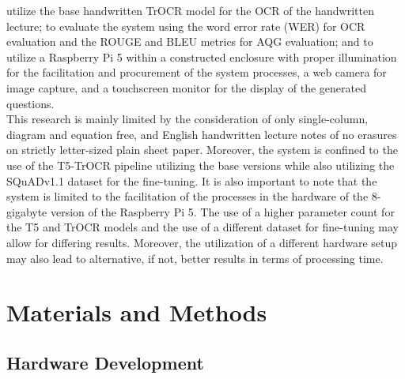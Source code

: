 \documentclass[conference]{IEEEtran}
\begin{document}
utilize the base handwritten TrOCR model for the OCR of the handwritten lecture;
to evaluate the system using the word error rate (WER) for OCR evaluation and
the ROUGE and BLEU metrics for AQG evaluation; and to utilize a Raspberry Pi 5
within a constructed enclosure with proper illumination for the 
facilitation and procurement of the system processes, a web camera for image
capture, and a touchscreen monitor for the display of the generated questions.
\\ 
\indent This research is mainly limited by the consideration of only 
single-column, diagram and equation free, and English handwritten lecture notes 
of no erasures on strictly letter-sized plain sheet paper.
Moreover, the system is confined to the 
use of the T5-TrOCR pipeline utilizing the base versions while 
also utilizing the SQuADv1.1 dataset for the fine-tuning. It is also important 
to note that the system is limited to the facilitation of the processes in 
the hardware of the 8-gigabyte version of the Raspberry Pi 5. The use of 
a higher parameter count for the T5 and TrOCR models and the use of a different 
dataset for fine-tuning may allow for differing results. Moreover, the 
utilization of a different hardware setup may also lead to alternative, if not, 
better results in terms of processing time. 


\section{Materials and Methods}
    \subsection{Hardware Development}
\end{document}
